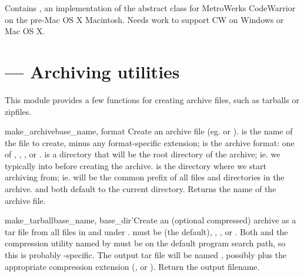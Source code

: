 \documentclass{manual}
\begin{document}
Contains , an implementation of the abstract 
 class for MetroWerks CodeWarrior on the pre-Mac OS X Macintosh.
Needs work to support CW on Windows or Mac OS X.


%

\section{ --- 
			Archiving utilities}

This module provides a few functions for creating archive files, such as 
tarballs or zipfiles.

\begin{funcdesc}{make_archive}{base_name, format}
Create an archive file (eg.  or ).   
is the name of the file to create, minus any format-specific extension; 
 is the archive format: one of , , 
, or .
 is a directory that will be the root directory of the
archive; ie. we typically  into  before 
creating the archive.   is the directory where we start 
archiving from; ie.  will be the common prefix of all files and
directories in the archive.   and  both default
to the current directory.  Returns the name of the archive file.

\end{funcdesc}

\begin{funcdesc}{make_tarball}{base_name, base_dir}'Create an (optional compressed) archive as a tar file from all files in and under .  must be  (the default), 
, , or .  Both 
and the compression utility named by  must be on the 
default program search path, so this is probably \UNIX-specific.  The 
output tar file will be named , possibly plus
the appropriate compression extension (,  or
).  Return the output filename.

\end{funcdesc}
\end{document}
